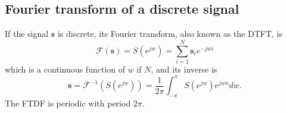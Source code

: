 \begin{subappendices}

\begin{comment}
\section{Energy Spectral Density (ESD)}

The ESD of a signal describes the distribution of the
energy\footnote{That obviously must be finite.} of the signal over
their frequency components. For a discrete-time signal $\mathbf{x}$,
the $\text{ESD}(\mathbf{x})$ is defined as
\begin{equation}
  \text{ESD}(\mathbf{x})=|\mathbf{X}|^2=\mathbf{X}\mathbf{X}^*,
\end{equation}
where $\mathbf{X}$ the DFT of $\mathbf{x}$, and $\mathbf{X}^*$ is its
complex conjugate.

\end{comment}

\section{Fourier transform of a discrete signal}
\label{sec:FTDF}

If the signal $\mathbf{s}$ is discrete, its Fourier transform, also
known as the \gls{DTFT}, is
\begin{equation}
  \mathcal{F}(\mathbf{s}) = S(e^{jw}) = \sum_{i=1}^{N}\mathbf{s}_ie^{-jwi}
\end{equation}
which is a continuous function of $w$ if $N$, and its inverse is
\begin{equation}
  \mathbf{s} = \mathcal{F}^{-1}(S(e^{jw})) = \frac{1}{2\pi}\int_{-\pi}^{\pi}S(e^{jw})e^{jwn}dw.
\end{equation}
The \acrshort{FTDF} is periodic with period $2\pi$.


\end{subappendices}

